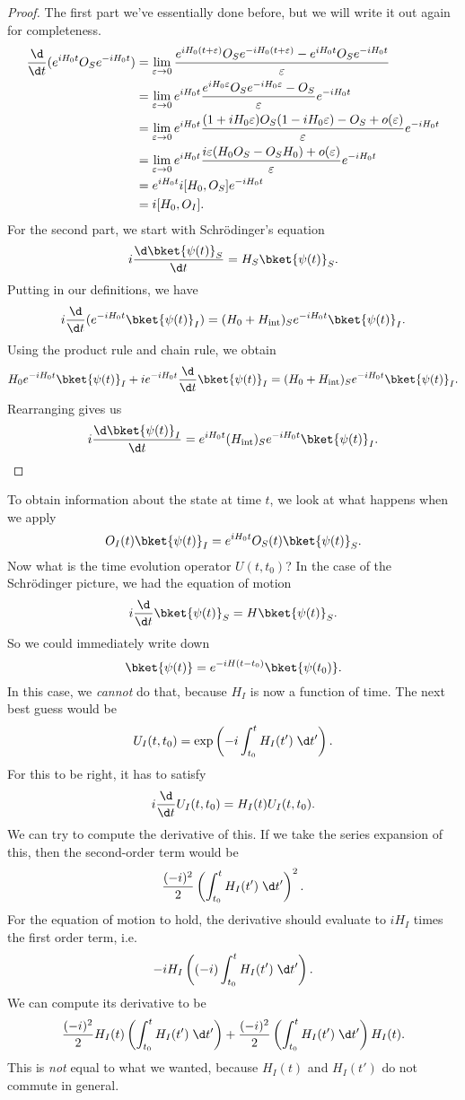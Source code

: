 \documentclass[a4paper]{article}
\begin{document}
\begin{proof}
  The first part we've essentially done before, but we will write it out again for completeness.
  \begin{align*}
    \frac{\d}{\d t} (e^{iH_0 t}O_S e^{-iH_0 t}) &= \lim_{\varepsilon \to 0} \frac{e^{iH_0(t + \varepsilon)} O_S e^{-iH_0(t +\varepsilon)} - e^{iH_0 t}O_Se^{-iH_0 t}}{\varepsilon}\\
    &= \lim_{\varepsilon \to 0} e^{iH_0 t}\frac{e^{iH_0 \varepsilon}O_S e^{-iH_0 \varepsilon}- O_S}{\varepsilon} e^{-iH_0 t}\\
    &= \lim_{\varepsilon \to 0} e^{iH_0 t}\frac{(1 + iH_0 \varepsilon)O_S(1 - iH_0 \varepsilon) - O_S + o(\varepsilon)}{\varepsilon} e^{-iH_0 t}\\
    &= \lim_{\varepsilon \to 0} e^{iH_0 t} \frac{i\varepsilon (H_0 O_S - O_S H_0) + o(\varepsilon)}{\varepsilon}e^{-iH_0 t}\\
    &= e^{iH_0 t}i [H_0 , O_S] e^{-iH_0 t}\\
    &= i [H_0, O_I].
  \end{align*}
  For the second part, we start with Schr\"odinger's equation
  \[
    i \frac{\d \bket{\psi(t)}_S}{\d t} = H_S \bket{\psi(t)}_S.
  \]
  Putting in our definitions, we have
  \[
    i \frac{\d}{\d t}(e^{-iH_0 t}\bket{\psi(t)}_I) = (H_0 + H_{\mathrm{int}})_S e^{-iH_0 t} \bket{\psi(t)}_I.
  \]
  Using the product rule and chain rule, we obtain
  \[
    H_0 e^{-iH_0 t}\bket{\psi(t)}_I + ie^{-iH_0t}\frac{\d}{\d t}\bket{\psi(t)}_I = (H_0 + H_{\mathrm{int}})_S e^{-iH_0 t} \bket{\psi(t)}_I.
  \]
  Rearranging gives us
  \[
    i \frac{\d \bket{\psi(t)}_I}{\d t} = e^{iH_0 t} (H_{\mathrm{int}})_S e^{-iH_0 t} \bket{\psi(t)}_I. \qedhere
  \]
\end{proof}
To obtain information about the state at time $t$, we look at what happens when we apply
\[
  O_I(t) \bket{\psi(t)}_I = e^{iH_0t}O_S(t) \bket{\psi(t)}_S.
\]
Now what is the time evolution operator $U(t, t_0)$? In the case of the Schr\"odinger picture, we had the equation of motion
\[
  i\frac{\d}{\d t}\bket{\psi(t)}_S = H\bket{\psi(t)}_S.
\]
So we could immediately write down
\[
  \bket{\psi(t)} = e^{-iH(t - t_0)} \bket{\psi(t_0)}.
\]
In this case, we \emph{cannot} do that, because $H_I$ is now a function of time. The next best guess would be
\[
  U_I(t, t_0) = \exp\left(-i \int_{t_0}^t H_I(t') \;\d t'\right).
\]
For this to be right, it has to satisfy
\[
  i\frac{\d}{\d t}U_I(t, t_0) = H_I(t) U_I(t, t_0).
\]
We can try to compute the derivative of this. If we take the series expansion of this, then the second-order term would be
\[
  \frac{(-i)^2}{2} \left(\int_{t_0}^t H_I(t') \;\d t'\right)^2.
\]
For the equation of motion to hold, the derivative should evaluate to $iH_I$ times the first order term, i.e.
\[
  -i H_I \left( (-i)\int_{t_0}^t H_I(t')\;\d t'\right).
\]
We can compute its derivative to be
\[
  \frac{(-i)^2}{2} H_I(t) \left(\int_{t_0}^t H_I(t')\;\d t'\right) + \frac{(-i)^2}{2} \left(\int_{t_0}^t H_I(t') \;\d t'\right) H_I(t) .
\]
This is \emph{not} equal to what we wanted, because $H_I(t)$ and $H_I(t')$ do not commute in general.
\end{document}

